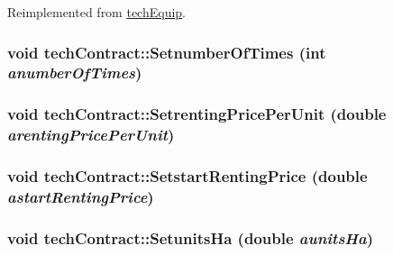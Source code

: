 Reimplemented from \hyperlink{classtech_equip_a7b8543a8ead2be2a6a00d80123895e2c}{techEquip}.\hypertarget{classtech_contract_a31af339397288e016ca5fef822dbcdd9}{
\subsubsection[{SetnumberOfTimes}]{\setlength{\rightskip}{0pt plus 5cm}void techContract::SetnumberOfTimes (int {\em anumberOfTimes})}}
\label{classtech_contract_a31af339397288e016ca5fef822dbcdd9}
\hypertarget{classtech_contract_a6efd811b5d5aed99c106a576037a766b}{
\subsubsection[{SetrentingPricePerUnit}]{\setlength{\rightskip}{0pt plus 5cm}void techContract::SetrentingPricePerUnit (double {\em arentingPricePerUnit})}}
\label{classtech_contract_a6efd811b5d5aed99c106a576037a766b}
\hypertarget{classtech_contract_a4cb6a5a5b0d20132628fc7346b594a21}{
\subsubsection[{SetstartRentingPrice}]{\setlength{\rightskip}{0pt plus 5cm}void techContract::SetstartRentingPrice (double {\em astartRentingPrice})}}
\label{classtech_contract_a4cb6a5a5b0d20132628fc7346b594a21}
\hypertarget{classtech_contract_a997f741bff19d4c1552868a0211d7696}{
\subsubsection[{SetunitsHa}]{\setlength{\rightskip}{0pt plus 5cm}void techContract::SetunitsHa (double {\em aunitsHa})}}
